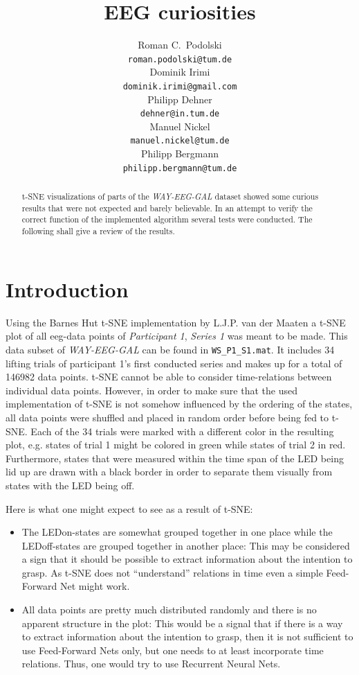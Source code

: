 \documentclass{article} %
\title{EEG curiosities}
\author{
Roman C.~Podolski
\\
\texttt{roman.podolski@tum.de} \\
\And
Dominik Irimi \\
\texttt{dominik.irimi@gmail.com} \\
\AND
Philipp Dehner \\
\texttt{dehner@in.tum.de} \\
\And
Manuel Nickel \\
\texttt{manuel.nickel@tum.de} \\
\And
Philipp Bergmann \\
\texttt{philipp.bergmann@tum.de} \\
}
\begin{document}
\maketitle

\begin{abstract}
t-SNE visualizations of parts of the \emph{WAY-EEG-GAL} dataset showed some curious results that were not expected and barely believable. In an attempt to verify the correct function of the implemented algorithm several tests were conducted. The following shall give a review of the results.
\end{abstract}

\section{Introduction}
Using the Barnes Hut t-SNE implementation by L.J.P. van der Maaten a t-SNE plot of all eeg-data points of \emph{Participant 1}, \emph{Series 1} was meant to be made. This data subset of \emph{WAY-EEG-GAL} can be found in \verb|WS_P1_S1.mat|. It includes 34 lifting trials of participant 1's first conducted series and makes up for a total of 146982 data points. t-SNE cannot be able to consider time-relations between individual data points. However, in order to make sure that the used implementation of t-SNE is not somehow influenced by the ordering of the states, all data points were shuffled and placed in random order before being fed to t-SNE. Each of the 34 trials were marked with a different color in the resulting plot, e.g. states of trial 1 might be colored in green while states of trial 2 in red. Furthermore, states that were measured within the time span of the LED being lid up are drawn with a black border in order to separate them visually from states with the LED being off.

Here is what one might expect to see as a result of t-SNE:
\begin{itemize}
	\item The LEDon-states are somewhat grouped together in one place while the LEDoff-states are grouped together in another place:
	This may be considered a sign that it should be possible to extract information about the intention to grasp. As t-SNE does not ``understand'' relations in time even a simple Feed-Forward Net might work.
	\item All data points are pretty much distributed randomly and there is no apparent structure in the plot:
	This would be a signal that if there is a way to extract information about the intention to grasp, then it is not sufficient to use Feed-Forward Nets only, but one needs to at least incorporate time relations. Thus, one would try to use Recurrent Neural Nets.
\end{itemize}
\end{document}

